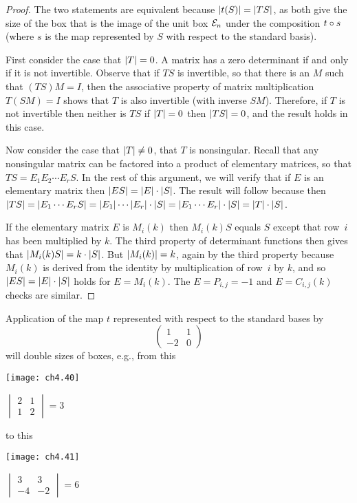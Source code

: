 \begin{proof}
The two statements are equivalent because
$\deter{t(S)}=\deter{TS}$, as both give the size of the box that is the
image of the unit box ${\cal E}_n$ under the composition $t\mathbin\circ s$
(where $s$ is the map represented by $S$ with respect to the standard basis).

First consider the case that $\deter{T}=0$.
A matrix has a zero determinant if and only if it is not invertible.
Observe that if \( TS \) is invertible, so that there
is an $M$ such that \( (TS)M=I \), then
the associative property of matrix multiplication 
\( T(SM)=I \) shows that \( T \) is also invertible  (with inverse $SM$).
Therefore, if \( T \) is not invertible then neither is \( TS \) \Dash 
if $\deter{T}=0$ then $\deter{TS}=0$,
and the result holds in this case.

Now consider the case that $\deter{T}\neq 0$, that $T$ is nonsingular. 
Recall that any nonsingular matrix can be factored into a product 
of elementary matrices, so that $TS=E_1E_2\cdots E_rS$.
In the rest of this argument, 
we will verify that if $E$ is an elementary matrix then
\( \deter{ES}=\deter{E}\cdot\deter{S} \). 
The result will follow because then 
$\deter{TS}=\deter{E_1\cdots E_rS}=\deter{E_1}\cdots\deter{E_r}\cdot\deter{S}
  =\deter{E_1\cdots E_r}\cdot\deter{S}=\deter{T}\cdot\deter{S}$.

If the elementary matrix $E$ is $M_i(k)$ 
then $M_i(k)S$ equals $S$ except that row~$i$ has been multiplied by $k$.
The third property of determinant functions
then gives that $\deter{M_i(k)S}=k\cdot\deter{S}$.
But $\deter{M_i(k)}=k$, again by the third property because
$M_i(k)$ is derived from the identity by multiplication of row~$i$ by
$k$, and so \( \deter{ES}=\deter{E}\cdot\deter{S} \) holds for
$E=M_i(k)$.
The $E=P_{i,j}=-1$ and $E=C_{i,j}(k)$ checks are similar.
\end{proof}


\begin{example}
Application of the map $t$ represented with respect to the standard  
bases by
\begin{equation*}
  \begin{pmatrix}
    1  &1  \\
   -2  &0
  \end{pmatrix}
\end{equation*}
will double sizes of boxes, e.g., from this
\begin{center}
    \parbox{1.5in}{\hbox{}\hfil\texttt{[image: ch4.40]}\hfil\hbox{}}  
    \quad
    $\begin{vmatrix}
      2  &1  \\
      1  &2
    \end{vmatrix}=3$
\end{center}
to this
\begin{center}
    \parbox{1.5in}{\hbox{}\hfil\texttt{[image: ch4.41]}\hfil\hbox{}}  
    \quad
    $\begin{vmatrix}
        3  &3  \\
       -4  &-2
     \end{vmatrix}=6$
\end{center}
\end{example}


